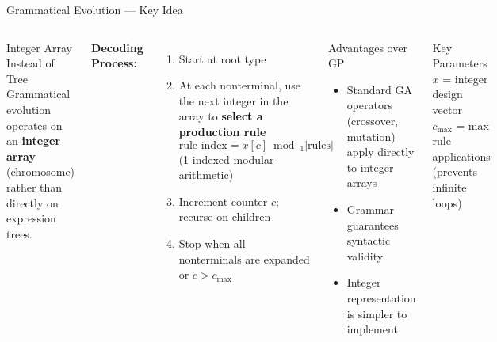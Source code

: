 \documentclass[aspectratio=169,10pt]{beamer}
\begin{document}
\begin{frame}{Grammatical Evolution --- Key Idea}
  \begin{columns}[T]
    \begin{block}{Integer Array Instead of Tree}
      Grammatical evolution operates on an \textbf{integer array} (chromosome)
      rather than directly on expression trees.
    \end{block}
    \medskip
    \textbf{Decoding Process:}
    \begin{enumerate}
      \item Start at root type
      \item At each nonterminal, use the next integer in the array to \textbf{select a production rule}
        \[ \text{rule index} = x[c] \bmod_1 |\text{rules}| \]
        (1-indexed modular arithmetic)
      \item Increment counter $c$; recurse on children
      \item Stop when all nonterminals are expanded or $c > c_{\max}$
    \end{enumerate}
    \begin{alertblock}{Advantages over GP}
      \begin{itemize}
        \item Standard GA operators (crossover, mutation) apply directly to integer arrays
        \item Grammar guarantees syntactic validity
        \item Integer representation is simpler to implement
      \end{itemize}
    \end{alertblock}
    \medskip
    \begin{exampleblock}{Key Parameters}
      $x$ = integer design vector \\
      $c_{\max}$ = max rule applications (prevents infinite loops)
    \end{exampleblock}
  \end{columns}
\end{frame}
\end{document}
